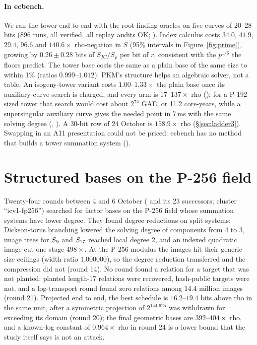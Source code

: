 \paragraph{In ecbench.} We ran the tower end to end with the root-finding
oracles on five curves of 20--28 bits (896 runs, all verified, all replay
audits OK; ). Index calculus
costs $34.0$, $41.9$, $29.4$, $96.6$ and $140.6\times$ rho-negation in $S$
(95\% intervals in Figure~\ref{fig:prime}), growing by $0.26\pm0.28$ bits of
$S_{IC}/S_\rho$ per bit of $r$, consistent with the $p^{1/6}$ the floors
predict. The tower base costs the same as a plain base of the same size to
within 1\% (ratios $0.999$--$1.012$): PKM's structure helps an algebraic
solver, not a table. An isogeny-tower variant costs $1.00$--$1.33\times$ the
plain base once its auxiliary-curve search is charged, and every arm is
$17$--$137\times$ rho ();
for a P-192-sized tower that search would cost about $2^{74}$ GAE, or
11.2 core-years, while a supersingular auxiliary curve gives the needed point
in 7\,ms with the same solving degree
(,
). A 30-bit row of 24 October
is $158.9\times$ rho (\S\ref{sec:ladder3}). Swapping in an A11 presentation
could not be priced: ecbench has no method that builds a tower summation
system ().

\section{Structured bases on the P-256 field}

Twenty-four rounds between 4 and 6 October
(
and its 23 successors; cluster ``icv1-fp256'') searched for factor bases on
the P-256 field whose summation systems have lower degree. They found
degree reductions on split systems: Dickson-torus branching lowered the
solving degree of components from 4 to 3, image trees for $S_{9}$ and
$S_{17}$ reached local degree 2, and an indexed quadratic image cut one
stage $498\times$. At the P-256 modulus the images hit their generic size
ceilings (width ratio $1.000000$), so the degree reduction transferred and
the compression did not (round 14). No round found a relation for a
target that was not planted: planted length-17 relations were recovered,
hash-public targets were not, and a log-transport round found zero
relations among 14.4 million images (round 21). Projected end to end, the
best schedule is $16.2$--$19.4$ bits above rho in the same unit, after a
symmetric projection of $2^{144.625}$ was withdrawn for exceeding its domain
(round 20); the final geometric bases are $392$--$404\times$ rho, and a
known-log constant of $0.964\times$ rho in round 24 is a lower bound that the
study itself says is not an attack.

